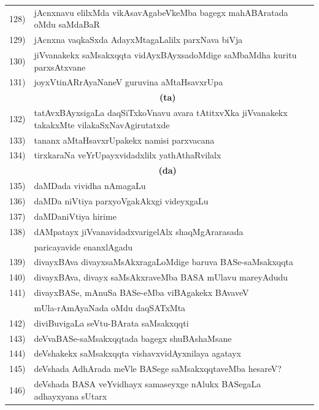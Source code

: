 \begin{longtable}{@{}cp{7.4cm}r}
128) & jAcnxnavu elilxMda vikAsavAgabeVkeMba bagegx mahABAratada oMdu saMdaBaR & \pageref{page162}\\
129) & jAcnxna vaqkaSxda AdayxMtagaLalilx parxNava biVja & \pageref{page138}\\
130) & jiVvanakekx saMsakxqqta vidAyxBAyxsadoMdige saMbaMdha kuritu parxsAtxvane & \pageref{page38}\\
131) & joyxVtinARrAyaNaneV guruvina aMtaHsavxrUpa & \pageref{80e}\\[0.3cm]
     &  \multicolumn{1}{c}{\textbf{(ta)}}  & \\[0.3cm]    
132) & tatAvxBAyxsigaLa daqSiTxkoVnavu avara tAtitxvXka jiVvanakekx takakxMte vilakaSxNavAgirutatxde & \pageref{page175}\\
133) & tananx aMtaHsavxrUpakekx namisi parxvacana & \pageref{80b}\\
134) & tirxkaraNa veYrUpayxvidadxlilx yathAthaRvilalx & \pageref{page69a}\\[0.3cm]
     &  \multicolumn{1}{c}{\textbf{(da)}}  & \\[0.3cm]
135) & daMDada vividha nAmagaLu &  \pageref{page100}\\
136) & daMDa niVtiya parxyoVgakAkxgi videyxgaLu & \pageref{page99}\\
137) & daMDaniVtiya hirime & \pageref{page96a} \\
138) & dAMpatayx jiVvanavidadxvarigelAlx shaqMgArarasada & \\
     & paricayavide enanxlAgadu & \pageref{page221}\\
139) & divayxBAva divayxsaMsAkxragaLoMdige baruva BASe-saMsakxqqta & \pageref{page10}\\
140) & divayxBAva, divayx saMsAkxraveMba BASA mUlavu mareyAdudu & \pageref{page15a}\\
141) & divayxBASe, mAnuSa BASe-eMba viBAgakekx BAvaveV &  \\
     & mUla-rAmAyaNada oMdu daqSATxMta & \pageref{page14}\\
142) & diviBuvigaLa seVtu-BArata saMsakxqqti & \pageref{page23}\\
143) & deVvaBASe-saMsakxqqtada bagegx shuBAshaMsane & \pageref{20b}\\
144) & deVshakekx saMsakxqqta vishavxvidAyxnilaya agatayx & \pageref{page37a}\\
145) & deVshada AdhArada meVle BASege saMsakxqqtaveMba hesareV? & \pageref{page7a}\\
146) & deVshada BASA veYvidhayx samaseyxge nAlukx BASegaLa adhayxyana sUtarx &\pageref{page44}\\[0.3cm]     

\end{longtable}
